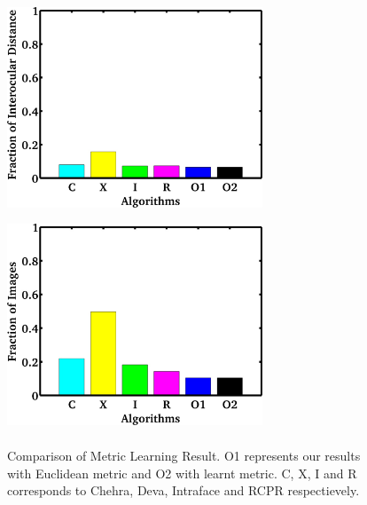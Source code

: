 \begin{figure}
  \centering
  \includegraphics[width=3.0in,height=2.5in]{fid/figures/iccv_version_one/cofw/wo_metric_vs_w_metric/mean_err_modified.jpg}
  \includegraphics[width=3.0in,height=2.5in]{fid/figures/iccv_version_one/cofw/wo_metric_vs_w_metric/fail_rate_modified.jpg}
  \caption{ Comparison of Metric Learning Result. O1 represents our results with Euclidean metric and O2 with learnt metric.
  C, X, I and R corresponds to Chehra, Deva, Intraface and RCPR respectievely.
  }
  \label{fig:metric_learning}
\end{figure}
